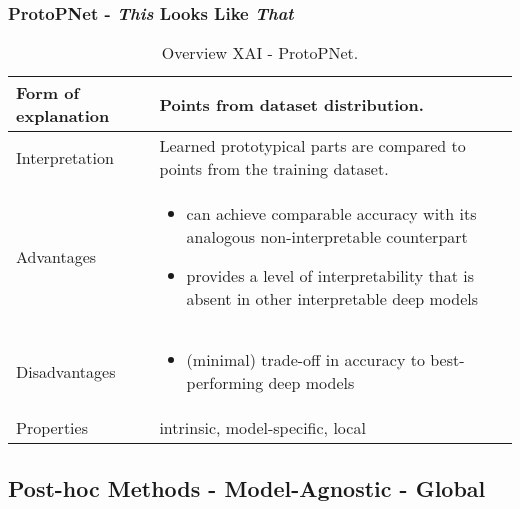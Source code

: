 \subsubsection{ProtoPNet - \textit{This} Looks Like \textit{That}}
\begin{table}[H]
  \centering
  \begin{tabular}{|p{}|p{}|}
    \hline
    Form of \newline explanation & 
    Points from dataset distribution.  \\
    
    \hline
    Interpretation & 
    Learned prototypical parts are compared to points from the training dataset.
     \\
 
    \hline
    Advantages &
    \begin{itemize}[nosep, left=0em]
        \item can achieve comparable accuracy with its analogous non-interpretable counterpart
        \item provides a level of interpretability that is absent in other interpretable deep models    
    \end{itemize} \\
    
    \hline
    Disadvantages &
    \begin{itemize}[nosep, left=0em]
        \item (minimal) trade-off in accuracy to best-performing deep models
    \end{itemize} \\
    
    \hline
    Properties & intrinsic, model-specific, local
      \\
    
    \hline
  \end{tabular}
  \caption[Overview XAI - ProtoPNet]{Overview XAI - ProtoPNet.\cite{NEURIPS2019_adf7ee2d}}
\end{table}



\subsection{Post-hoc Methods - Model-Agnostic - Global}

